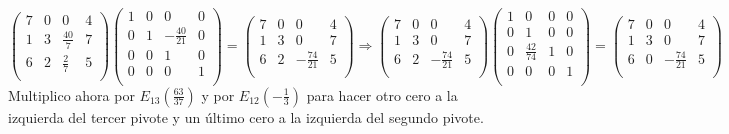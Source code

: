 \documentclass[11pt, a4paper]{article}
\newif\IfInSansMode
\theoremstyle{theorem-style}
\theoremstyle{definition-style}
\theoremstyle{remark-style}
\theoremstyle{example-style}
\begin{document}
$\begin{pmatrix}
7 & 0 & 0 & 4 \\
1 & 3 & \frac{40}{7} & 7 \\
6 & 2 & \frac{2}{7} & 5 \\
\end{pmatrix}
\begin{pmatrix}
1 & 0 & 0 & 0 \\
0 & 1 & -\frac{40}{21} & 0 \\
0 & 0 & 1 & 0 \\
0 & 0 & 0 & 1 \\
\end{pmatrix} 
 =
\begin{pmatrix}
7 & 0 & 0 & 4 \\
1 & 3 & 0 & 7 \\
6 & 2 & -\frac{74}{21} & 5 \\
\end{pmatrix} \Longrightarrow
\begin{pmatrix}
7 & 0 & 0 & 4 \\
1 & 3 & 0 & 7 \\
6 & 2 & -\frac{74}{21} & 5 \\
\end{pmatrix}
\begin{pmatrix}
1 & 0 & 0 & 0 \\
0 & 1 & 0 & 0 \\
0 & \frac{42}{74} & 1 & 0 \\
0 & 0 & 0 & 1 \\
\end{pmatrix} 
 = 
\begin{pmatrix}
7 & 0 & 0 & 4 \\
1 & 3 & 0 & 7 \\
6 & 0 & -\frac{74}{21} & 5 \\
\end{pmatrix}$ \\

Multiplico ahora por $E_{13}(\frac{63}{37})$ y por $E_{12}(-\frac{1}{3})$ para hacer otro cero a la izquierda del tercer pivote y un último cero a la izquierda del segundo pivote. \\
\end{document}
